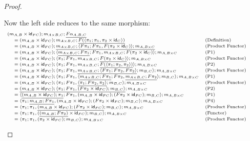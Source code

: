 \documentclass{article}
\newcommand{\id}[0]{\mathsf{id}}
\begin{document}
\begin{proof}
\begin{itemize}
    Now the left side reduces to the same morphism:
    \[
    \scriptsize
    \begin{array}{lll}
      (m_{A,B} \times \id_{FC});m_{A \times B,C};\underline{F\alpha_{A,B,C}} \\
    \,\,\,\,\,\,\,\,= (m_{A,B} \times \id_{FC});m_{A \times B,C};\underline{F(\langle \pi_1;\pi_1, \pi_2 \times \id_C \rangle)} & \text{(Definition)}\\
   \,\,\,\,\,\,\,\,= (m_{A,B} \times \id_{FC});\underline{m_{A \times B,C};\langle F\pi_1;F\pi_1, F(\pi_2 \times \id_C) \rangle;m_{A,B \times C}} & \text{(Product Functor)}\\
   \,\,\,\,\,\,\,\,= (m_{A,B} \times \id_{FC});\langle \underline{m_{A \times B,C};F\pi_1};F\pi_1, m_{A \times B,C};F(\pi_2 \times \id_C) \rangle;m_{A,B \times C} & \text{(P1)}\\
   \,\,\,\,\,\,\,\,= (m_{A,B} \times \id_{FC});\langle \pi_1;F\pi_1, m_{A \times B,C};\underline{F(\pi_2 \times \id_C)} \rangle;m_{A,B \times C} & \text{(Product Functor)}\\
   \,\,\,\,\,\,\,\,= (m_{A,B} \times \id_{FC});\langle \pi_1;F\pi_1, m_{A \times B,C};\underline{F(\langle \pi_1;\pi_2, \pi_2 \rangle)} \rangle;m_{A,B \times C} & \text{(P2)}\\
   \,\,\,\,\,\,\,\,= (m_{A,B} \times \id_{FC});\langle \pi_1;F\pi_1, \underline{m_{A \times B,C};\langle F\pi_1;F\pi_2, F\pi_2 \rangle};m_{B,C} \rangle;m_{A,B \times C} & \text{(Product Functor)}\\
   \,\,\,\,\,\,\,\,= (m_{A,B} \times \id_{FC});\langle \pi_1;F\pi_1, \langle \underline{m_{A \times B,C};F\pi_1};F\pi_2, \underline{m_{A \times B,C};F\pi_2} \rangle;m_{B,C} \rangle;m_{A,B \times C} & \text{(P1)}\\
   \,\,\,\,\,\,\,\,= (m_{A,B} \times \id_{FC});\langle \pi_1;F\pi_1, \underline{\langle \pi_1;F\pi_2, \pi_2 \rangle};m_{B,C} \rangle;m_{A,B \times C} & \text{(Product Functor)}\\
   \,\,\,\,\,\,\,\,= \underline{(m_{A,B} \times \id_{FC});\langle \pi_1;F\pi_1, (F\pi_2 \times \id_{FC});m_{B,C} \rangle};m_{A,B \times C} & \text{(P2)}\\
   \,\,\,\,\,\,\,\,= \langle \underline{(m_{A,B} \times \id_{FC});\pi_1};F\pi_1, (m_{A,B} \times \id_{FC});(F\pi_2 \times \id_{FC});m_{B,C} \rangle;m_{A,B \times C} & \text{(P1)}\\
   \,\,\,\,\,\,\,\,= \langle \pi_1;\underline{m_{A,B};F\pi_1}, (m_{A,B} \times \id_{FC});(F\pi_2 \times \id_{FC});m_{B,C} \rangle;m_{A,B \times C} & \text{(P4)}\\
   \,\,\,\,\,\,\,\,= \langle \pi_1;\pi_1, \underline{(m_{A,B} \times \id_{FC});(F\pi_2 \times \id_{FC})};m_{B,C} \rangle;m_{A,B \times C} & \text{(Product Functor)}\\
   \,\,\,\,\,\,\,\,= \langle \pi_1;\pi_1, (\underline{(m_{A,B};F\pi_2)} \times \id_{FC});m_{B,C} \rangle;m_{A,B \times C} & \text{(Functor)}\\
   \,\,\,\,\,\,\,\,= \langle \pi_1;\pi_1, (\pi_2 \times \id_{FC});m_{B,C} \rangle;m_{A,B \times C} & \text{(Product Functor)}\\
    \end{array}
    \]


\end{itemize}
\end{proof}
\end{document}
